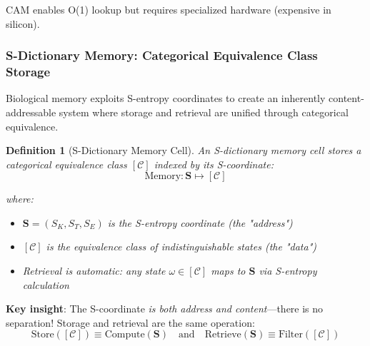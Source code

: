 \documentclass[11pt,a4paper]{article}
\newtheorem{definition}{Definition}[section]
\begin{document}
CAM enables O(1) lookup but requires specialized hardware (expensive in silicon).

\subsubsection{S-Dictionary Memory: Categorical Equivalence Class Storage}

Biological memory exploits S-entropy coordinates to create an inherently content-addressable system where storage and retrieval are unified through categorical equivalence.

\begin{definition}[S-Dictionary Memory Cell]
\label{def:s_dictionary}
An S-dictionary memory cell stores a categorical equivalence class $[\mathcal{C}]$ indexed by its S-coordinate:
\begin{equation}
\text{Memory} : \mathbf{S} \mapsto [\mathcal{C}]
\end{equation}

where:
\begin{itemize}
\item $\mathbf{S} = (S_K, S_T, S_E)$ is the S-entropy coordinate (the "address")
\item $[\mathcal{C}]$ is the equivalence class of indistinguishable states (the "data")
\item Retrieval is automatic: any state $\omega \in [\mathcal{C}]$ maps to $\mathbf{S}$ via S-entropy calculation
\end{itemize}
\end{definition}

\textbf{Key insight}: The S-coordinate \textit{is both address and content}—there is no separation! Storage and retrieval are the same operation:
\begin{equation}
\text{Store}([\mathcal{C}]) \equiv \text{Compute}(\mathbf{S}) \quad \text{and} \quad \text{Retrieve}(\mathbf{S}) \equiv \text{Filter}([\mathcal{C}])
\end{equation}
\end{document}
